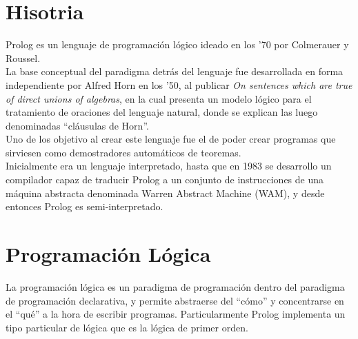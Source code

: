 \documentclass[12pt,titlepage]{article}
\begin{document}

\setcounter{page}{1}

\tableofcontents
\newpage



\clearpage	

\section{Hisotria}
Prolog es un lenguaje de programación lógico ideado en los '70 por Colmerauer y Roussel. \\

La base conceptual del paradigma detrás del lenguaje fue desarrollada en forma independiente por Alfred Horn en los '50, al publicar \textit{On sentences which are true of direct unions of algebras}, en la cual presenta un modelo lógico para el tratamiento de oraciones del lenguaje natural, donde se explican las luego denominadas ``cláusulas de Horn''. \\

Uno de los objetivo al crear este lenguaje fue el de poder crear programas que sirviesen como demostradores automáticos de teoremas. \\

Inicialmente era un lenguaje interpretado, hasta que en 1983 se desarrollo un compilador capaz de traducir Prolog a un conjunto de instrucciones de una máquina abstracta denominada Warren Abstract Machine (WAM), y desde entonces Prolog es semi-interpretado. \\

\section{Programación Lógica}
La programación lógica es un paradigma de programación dentro del paradigma de programación declarativa, y permite abstraerse del ``cómo'' y concentrarse en el ``qué'' a la hora de escribir programas. Particularmente Prolog implementa un tipo particular de lógica que es la lógica de primer orden. \\
\end{document}
